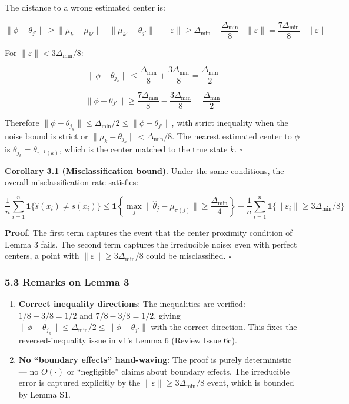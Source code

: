 \documentclass[
  12pt,
]{article}
\begin{document}
The distance to a wrong estimated center is:

\[\|\phi - \theta_{j'}\| \geq \|\mu_k - \mu_{k'}\| - \|\mu_{k'} - \theta_{j'}\| - \|\varepsilon\| \geq \Delta_{\min} - \frac{\Delta_{\min}}{8} - \|\varepsilon\| = \frac{7\Delta_{\min}}{8} - \|\varepsilon\|\]

For \(\|\varepsilon\| < 3\Delta_{\min}/8\):

\[\|\phi - \theta_{j_k}\| \leq \frac{\Delta_{\min}}{8} + \frac{3\Delta_{\min}}{8} = \frac{\Delta_{\min}}{2}\]

\[\|\phi - \theta_{j'}\| \geq \frac{7\Delta_{\min}}{8} - \frac{3\Delta_{\min}}{8} = \frac{\Delta_{\min}}{2}\]

Therefore
\(\|\phi - \theta_{j_k}\| \leq \Delta_{\min}/2 \leq \|\phi - \theta_{j'}\|\),
with strict inequality when the noise bound is strict or
\(\|\mu_k - \theta_{j_k}\| < \Delta_{\min}/8\). The nearest estimated
center to \(\phi\) is \(\theta_{j_k} = \theta_{\pi^{-1}(k)}\), which is
the center matched to the true state \(k\). \(\square\)

\textbf{Corollary 3.1 (Misclassification bound)}. Under the same
conditions, the overall misclassification rate satisfies:

\[\frac{1}{n}\sum_{i=1}^n \mathbf{1}\{\hat{s}(x_i) \neq s(x_i)\}
\leq \mathbf{1}\left\{\max_j \|\hat{\theta}_j - \mu_{\pi(j)}\| \geq \frac{\Delta_{\min}}{4}\right\}
+ \frac{1}{n}\sum_{i=1}^n \mathbf{1}\{\|\varepsilon_i\| \geq 3\Delta_{\min}/8\}\]

\textbf{Proof}. The first term captures the event that the center
proximity condition of Lemma 3 fails. The second term captures the
irreducible noise: even with perfect centers, a point with
\(\|\varepsilon\| \geq 3\Delta_{\min}/8\) could be misclassified.
\(\square\)

\subsubsection{5.3 Remarks on Lemma 3}\label{remarks-on-lemma-3}

\begin{enumerate}
\def\labelenumi{\arabic{enumi}.}
\item
  \textbf{Correct inequality directions}: The inequalities are verified:
  \(1/8 + 3/8 = 1/2\) and \(7/8 - 3/8 = 1/2\), giving
  \(\| \phi - \theta_{j_k} \| \leq \Delta_{\min}/2 \leq \|\phi - \theta_{j'}\|\)
  with the correct direction. This fixes the reversed-inequality issue
  in v1's Lemma 6 (Review Issue 6c).
\item
  \textbf{No ``boundary effects'' hand-waving}: The proof is purely
  deterministic --- no \(O(\cdot)\) or ``negligible'' claims about
  boundary effects. The irreducible error is captured explicitly by the
  \(\|\varepsilon\| \geq 3\Delta_{\min}/8\) event, which is bounded by
  Lemma S1.
\end{enumerate}
\end{document}
